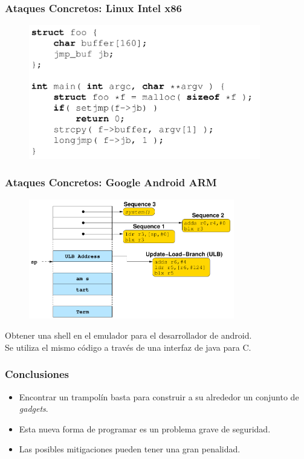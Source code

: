 \documentclass{beamer}
\begin{document}
\begin{frame}
    \frametitle{Ataques Concretos: Linux Intel x86}
    
    \begin{figure}
        \centering
        \includegraphics[width=0.9\textwidth]{LinuxIntel86.png}
    \end{figure}
        
    
\end{frame}

\begin{frame}
    \frametitle{Ataques Concretos: Google Android ARM}
    \begin{figure}
        \centering
        \includegraphics[width=0.8\textwidth]{GoogleAndroidARM.png}
    \end{figure}
        
    Obtener una shell en el emulador para el desarrollador de android.\\
    Se utiliza el mismo código a través de una interfaz de java para C.
\end{frame}

\begin{frame}
    \frametitle{Conclusiones}
    \begin{itemize}
        \item Encontrar un trampolín basta para construir a su alrededor un conjunto de \textit{gadgets}.
        \item Esta nueva forma de programar es un problema grave de seguridad.
        \item Las posibles mitigaciones pueden tener una gran penalidad.
    \end{itemize}
\end{frame}
\end{document}
